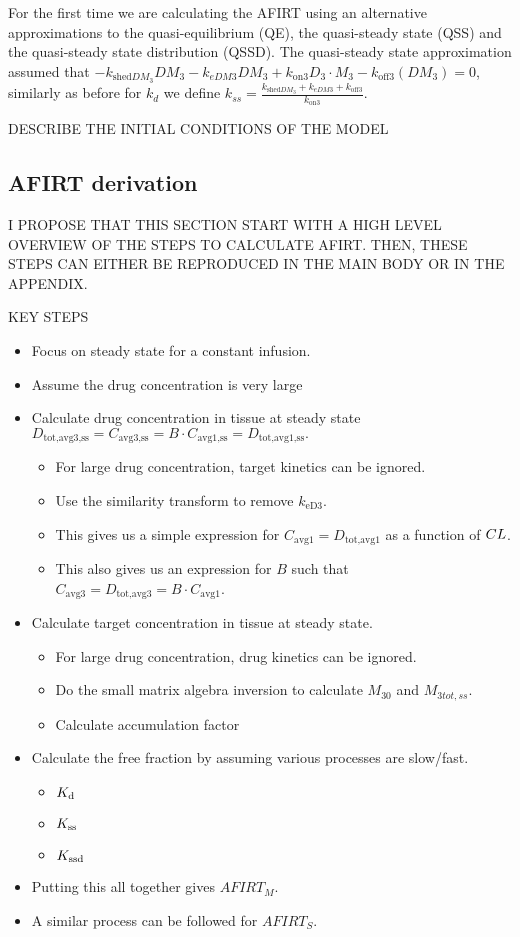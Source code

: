 For the first time we are calculating the AFIRT using an alternative approximations to the quasi-equilibrium (QE), the quasi-steady state (QSS) and the quasi-steady state distribution (QSSD). The quasi-steady state approximation assumed that $-k_{\text{shed}DM_3}DM_3 - k_{eDM3}DM_3+k_{\text{on}3}D_3 \cdot M_3 - k_{\text{off}3}(DM_3) = 0 $, similarly as before for $k_d$ we define $k_{ss}=\frac{k_{\text{shed}DM_3} + k_{eDM3}+ k_{\text{off}3}}{k_{\text{on}3}}$. 

DESCRIBE THE INITIAL CONDITIONS OF THE MODEL

\subsection{AFIRT derivation}
I PROPOSE THAT THIS SECTION START WITH A HIGH LEVEL OVERVIEW OF THE STEPS TO CALCULATE AFIRT.  THEN, THESE STEPS CAN EITHER BE REPRODUCED IN THE MAIN BODY OR IN THE APPENDIX.  

KEY STEPS
\begin{itemize}
\item Focus on steady state for a constant infusion.
\item Assume the drug concentration is very large
\item Calculate drug concentration in tissue at steady state $D_\text{tot,avg3,ss} = C_\text{avg3,ss} = B\cdot C_\text{avg1,ss} = D_\text{tot,avg1,ss}.$
	\begin{itemize}
		\item  For large drug concentration, target kinetics can be ignored. 
		\item Use the similarity transform to remove $k_\text{eD3}$.
		\item This gives us a simple expression for $C_\text{avg1} = D_\text{tot,avg1}$ as a function of $CL$.
		\item This also gives us an expression for $B$ such that $C_\text{avg3} = D_\text{tot,avg3} = B\cdot C_\text{avg1}$.
	\end{itemize}
\item Calculate target concentration in tissue at steady state.
	\begin{itemize}
		\item For large drug concentration, drug kinetics can be ignored.
		\item Do the small matrix algebra inversion to calculate $M_{30}$ and $M_{3tot,ss}$.
		\item Calculate accumulation factor
	\end{itemize}
\item Calculate the free fraction by assuming various processes are slow/fast.
	\begin{itemize}
		\item $K_\text{d}$
		\item $K_\text{ss}$
		\item $K_\text{ssd}$
	\end{itemize}	
\item Putting this all together gives $AFIRT_M$.  
\item A similar process can be followed for $AFIRT_S$.	
\end{itemize}




